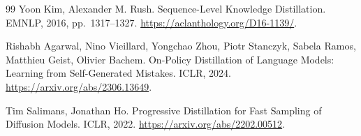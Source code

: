 \documentclass[UTF8,12pt,a4paper,fontset=fandol]{ctexart}
\begin{document}
\begin{thebibliography}{99}
Yoon Kim, Alexander M. Rush.
Sequence-Level Knowledge Distillation.
EMNLP, 2016, pp.~1317--1327.
\url{https://aclanthology.org/D16-1139/}.

Rishabh Agarwal, Nino Vieillard, Yongchao Zhou, Piotr Stanczyk, Sabela Ramos, Matthieu Geist, Olivier Bachem.
On-Policy Distillation of Language Models: Learning from Self-Generated Mistakes.
ICLR, 2024. \url{https://arxiv.org/abs/2306.13649}.

Tim Salimans, Jonathan Ho.
Progressive Distillation for Fast Sampling of Diffusion Models.
ICLR, 2022. \url{https://arxiv.org/abs/2202.00512}.
\end{thebibliography}
\end{document}
